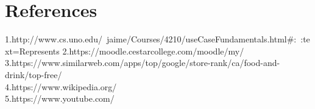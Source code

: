 \documentclass[12pt]{article}
\begin{document}




\section{References}
1.http://www.cs.uno.edu/~jaime/Courses/4210/useCaseFundamentals.html#:~:text=Represents%
\newline
2.https://moodle.cestarcollege.com/moodle/my/ \\
3.https://www.similarweb.com/apps/top/google/store-rank/ca/food-and-drink/top-free/ \\
4.https://www.wikipedia.org/ \\
5.https://www.youtube.com/ \\
\end{document}
